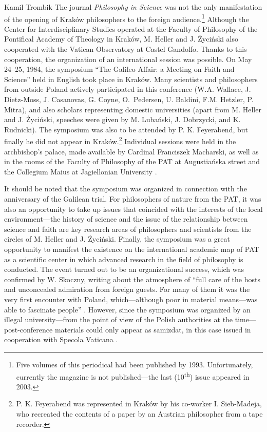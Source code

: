 \begin{artengenv}{Kamil Trombik}
The journal \textit{Philosophy in Science} was not the only manifestation of the opening of Kraków philosophers to the
foreign audience.\footnote{Five volumes of this periodical had been published by 1993. Unfortunately, currently the
magazine is not published---the last (10\textsuperscript{th}) issue appeared in 2003.} Although the Center for
Interdisciplinary Studies operated at the Faculty of Philosophy of the Pontifical Academy of Theology in Kraków, M.
Heller and J. Życiński also cooperated with the Vatican Observatory at Castel Gandolfo. Thanks to this cooperation, the
organization of an international session was possible. On May 24--25, 1984, the symposium ``The Galileo
Affair: a Meeting on Faith and Science'' held in English took place in Kraków. Many scientists and philosophers from outside Poland
actively participated in this conference (W.A. Wallace, J. Dietz-Moss, J. Casanovas, G. Coyne, O.~Pedersen, U. Baldini,
F.M. Hetzler, P. Mitra), and also scholars representing domestic universities (apart from M. Heller and J. Życiński,
speeches were given by M. Lubański, J. Dobrzycki, and K. Rudnicki). The symposium was also to be attended by P. K.
Feyerabend, but finally he did not appear in Kraków.\footnote{P. K. Feyerabend was represented in Kraków by his
co-worker I. Sieb-Madeja, who recreated the contents of a paper by an Austrian philosopher from a tape recorder.}
Individual sessions were held in the archbishop's palace, made available by Cardinal Franciszek Macharski, as well as
in the rooms of the Faculty of Philosophy of the PAT at Augustiańska street and the Collegium Maius at Jagiellonian
University
\parencite{skoczny_sympozjum_1984}.

It should be noted that the symposium was organized in connection with the anniversary of the Galilean trial. For
philosophers of nature from the PAT, it was also an opportunity to take up issues that coincided with the interests of
the local environment---the history of science and the issue of the relationship between science and faith are key
research areas of philosophers and scientists from the circles of M. Heller and J. Życiński. Finally, the symposium was
a great opportunity to manifest the existence on the international academic map of PAT as a scientific center in which
advanced research in the field of philosophy is conducted. The event turned out to be an organizational success, which
was confirmed by W. Skoczny, writing about the atmosphere of ``full care of the hosts and unconcealed admiration from
foreign guests. For many of them it was the very first encounter with Poland, which---although poor in material means---was able
to fascinate people''
\parencite[p.73]{skoczny_sympozjum_1984}.
However, since the symposium was organized by an
illegal university---from the point of view of the Polish authorities at the time---post-conference materials could
only appear as samizdat, in this case issued in cooperation with Specola Vaticana
\parencite{coyne_galileo_1985}.


\end{artengenv}
